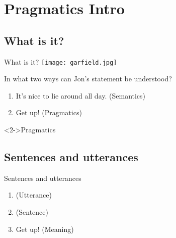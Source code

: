 \documentclass{beamer}
\subtitle[Pragmatics Intro]{Introduction to Pragmatics}
\newcommand{\suboneone}{What is it?}
\newcommand{\subonetwo}{Sentences and utterances}
\begin{document}
  

  \section{Pragmatics Intro}
    \subsection{\suboneone}
      \begin{frame}{\suboneone}
        \texttt{[image: garfield.jpg]}
        \begin{block}{In what two ways can Jon's statement be understood?}
          \begin{enumerate}
            \item<2-> It's nice to lie around all day. \hfill (Semantics)
            \item<2-> Get up!                          \hfill (Pragmatics)
          \end{enumerate}
        \end{block}
        \begin{alertblock}<2->{Pragmatics}
          
        \end{alertblock}
      \end{frame}

    \subsection{\subonetwo}
      \begin{frame}[t]{\subonetwo}
        \begin{example}
          \begin{enumerate}
            \item {}  \hfill (Utterance)
            \item {} \hfill (Sentence)
            \item Get up!                                       \hfill (Meaning)
          \end{enumerate}
        \end{example}
      \end{frame}
\end{document}
